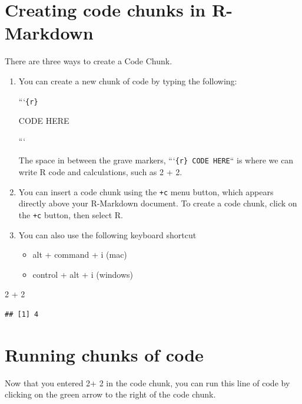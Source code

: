 \documentclass[
]{book}
\newenvironment{Shaded}{\begin{snugshade}}{\end{snugshade}}
\newcommand{\DecValTok}[1]{\textcolor[rgb]{0.00,0.00,0.81}{#1}}
\newcommand{\SpecialCharTok}[1]{\textcolor[rgb]{0.00,0.00,0.00}{#1}}
\begin{document}
\hypertarget{creating-code-chunks-in-r-markdown}{%
\section{Creating code chunks in R-Markdown}\label{creating-code-chunks-in-r-markdown}}

There are three ways to create a Code Chunk.

\begin{enumerate}
\def\labelenumi{\arabic{enumi}.}
\item
  You can create a new chunk of code by typing the following:

  ```\texttt{\{r\}}

  CODE HERE

  ```

  The space in between the grave markers, ```\texttt{\{r\}\textasciigrave{}\ CODE\ HERE}`` is where we can write R code and calculations, such as 2 + 2.
\item
  You can insert a code chunk using the \texttt{+c} menu button, which appears directly above your R-Markdown document. To create a code chunk, click on the \texttt{+c} button, then select R.
\item
  You can also use the following keyboard shortcut

  \begin{itemize}
  \item
    alt + command + i (mac)
  \item
    control + alt + i (windows)
  \end{itemize}
\end{enumerate}

\begin{Shaded}
\begin{Highlighting}[]
\DecValTok{2} \SpecialCharTok{+} \DecValTok{2}
\end{Highlighting}
\end{Shaded}

\begin{verbatim}
## [1] 4
\end{verbatim}

\hypertarget{running-chunks-of-code}{%
\section{Running chunks of code}\label{running-chunks-of-code}}

Now that you entered 2+ 2 in the code chunk, you can run this line of code by clicking on the green arrow to the right of the code chunk.
\end{document}
